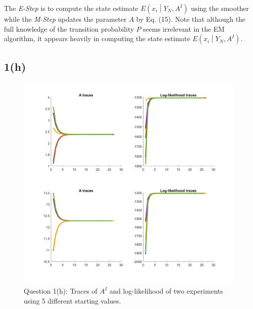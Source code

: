 \documentclass[a4paper, 11pt]{article}
\begin{document}
The \textit{E-Step} is to compute the state estimate $E\left(x_i\middle| Y_N, A^I \right)$ using the smoother while the \textit{M-Step} updates the parameter $A$ by Eq. (15). Note that although the full knowledge of the transition probability $P$ seems irrelevant in the EM algorithm, it appears heavily in computing the state estimate $E\left(x_i\middle| Y_N, A^I \right)$.


\subsection*{1(h)}

\begin{figure}
	\begin{center}
		\includegraphics[width=7in]{q1h.png}
		\caption{Question 1(h): Traces of $A^I$ and log-likelihood of two experiments using 5 different starting values. }
	\end{center}
\end{figure}
\end{document}
